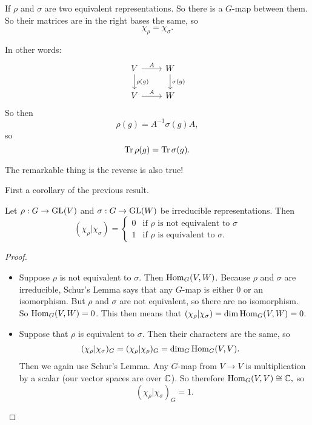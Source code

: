 
\begin{remark}
    If $\rho$ and $\sigma$ are two equivalent representations. So there is a $G$-map between them. So their matrices are in the right bases the same, so 
    \[
        \chi_{\rho} = \chi_{\sigma}
    .\] 

    In other words:
    \[
        \begin{tikzcd}
            V \arrow[d, "\rho(g)"]\arrow[r, "A"] & W \arrow[d, "\sigma(g)"]\\
            V \arrow[r, "A"] & W
        \end{tikzcd}
    \]
    So then
    \[
        \rho(g) = A^{-1} \sigma(g) A
    ,\] 
    so 
    \[
        \operatorname{Tr} \rho(g) = \operatorname{Tr} \sigma(g)
    .\] 

    The remarkable thing is the reverse is also true!
\end{remark}

First a corollary of the previous result.

\begin{corollary}
    Let $\rho: G \to \operatorname{GL}(V)$ and $\sigma: G \to \operatorname{GL}(W)$ be irreducible representations.
    Then 
    \[
        (\chi_{\rho} | \chi_{\sigma}) = \begin{cases}
            0 & \text{if $\rho$ is not equivalent to $\sigma$}\\
            1 & \text{if $\rho$ is equivalent to $\sigma$.}
        \end{cases}
    \] 
\end{corollary}
\begin{proof}
    \begin{itemize}
        \item Suppose $\rho$ is not equivalent to $\sigma$.
            Then $\operatorname{Hom}_{G}(V, W)$.
            Because $\rho$ and  $\sigma$ are irreducible, Schur's Lemma says that any  $G$-map is either $0$ or an isomorphism. But $\rho$ and $\sigma$ are not equivalent, so there are no isomorphism. So  $ \operatorname{Hom}_{G}(V, W) = 0$.
            This then means that $(\chi_{\rho} | \chi_{\sigma}) = \dim \operatorname{Hom}_{G}(V, W) = 0$.
        \item Suppose that $\rho$ is equivalent to $\sigma$.
            Then their characters are the same, so 
            \begin{align*}
                (\chi_{\rho} | \chi_{\sigma})_G &= (\chi_{\rho} | \chi_{\rho})_G = \dim_G \operatorname{Hom}_{G}(V, V)
            .\end{align*}
            Then we again use Schur's Lemma. Any $G$-map from $V \to  V$ is multiplication by a scalar (our vector spaces are over $\mathbb{C}$).
            So therefore $ \operatorname{Hom}_{G}(V, V) \cong \mathbb{C} ,$ 
            so
            \[
                (\chi_{\rho} | \chi_{\sigma})_G = 1
            .\] 
    \end{itemize}
\end{proof}

